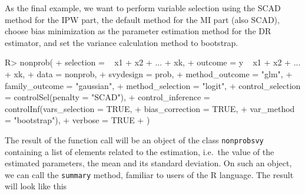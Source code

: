 \documentclass[
]{jss}
\begin{document}
As the final example, we want to perform variable selection using the
SCAD method for the IPW part, the default method for the MI part (also
SCAD), choose bias minimization as the parameter estimation method for
the DR estimator, and set the variance calculation method to bootstrap.

\begin{CodeChunk}
\begin{CodeInput}
R> nonprob(
+   selection = ~ x1 + x2 + ... + xk, 
+   outcome = y ~ x1 + x2 + ... + xk, 
+   data = nonprob, 
+   svydesign = prob, 
+   method_outcome = "glm", 
+   family_outcome = "gaussian",
+   method_selection = "logit",
+   control_selection = controlSel(penalty = "SCAD"),
+   control_inference = controlInf(vars_selection = TRUE,
+                                  bias_correction = TRUE,
+                                  var_method = "bootstrap"),
+   verbose = TRUE
+ )
\end{CodeInput}
\end{CodeChunk}

The result of the function call will be an object of the class
\texttt{nonprobsvy} containing a list of elements related to the
estimation, i.e.~the value of the estimated parameters, the mean and its
standard deviation. On such an object, we can call the \texttt{summary}
method, familiar to users of the R language. The result will look like
this
\end{document}
